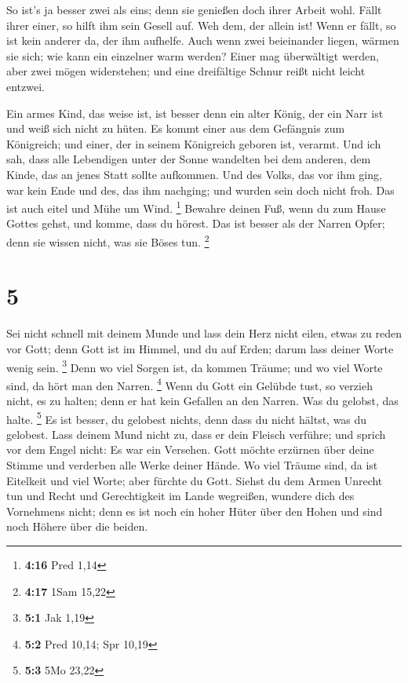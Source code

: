  So ist's ja besser zwei als eins; denn sie genießen doch
ihrer Arbeit wohl.  Fällt ihrer einer, so hilft ihm sein
Gesell auf. Weh dem, der allein ist! Wenn er fällt, so ist kein anderer
da, der ihm aufhelfe.  Auch wenn zwei beieinander liegen,
wärmen sie sich; wie kann ein einzelner warm werden? 
Einer mag überwältigt werden, aber zwei mögen widerstehen; und eine
dreifältige Schnur reißt nicht leicht entzwei.

 Ein armes Kind, das weise ist, ist besser denn ein alter
König, der ein Narr ist und weiß sich nicht zu hüten.  Es
kommt einer aus dem Gefängnis zum Königreich; und einer, der in seinem
Königreich geboren ist, verarmt.  Und ich sah, dass alle
Lebendigen unter der Sonne wandelten bei dem anderen, dem Kinde, das an
jenes Statt sollte aufkommen.  Und des Volks, das vor ihm
ging, war kein Ende und des, das ihm nachging; und wurden sein doch
nicht froh. Das ist auch eitel und Mühe um Wind. \footnote{\textbf{4:16}
  Pred 1,14}  Bewahre deinen Fuß, wenn du zum Hause
Gottes gehst, und komme, dass du hörest. Das ist besser als der Narren
Opfer; denn sie wissen nicht, was sie Böses tun. \footnote{\textbf{4:17}
  1Sam 15,22}

\hypertarget{section-1}{%
\section{5}\label{section-1}}

 Sei nicht schnell mit deinem Munde und lass dein Herz
nicht eilen, etwas zu reden vor Gott; denn Gott ist im Himmel, und du
auf Erden; darum lass deiner Worte wenig sein. \footnote{\textbf{5:1}
  Jak 1,19}  Denn wo viel Sorgen ist, da kommen Träume;
und wo viel Worte sind, da hört man den Narren. \footnote{\textbf{5:2}
  Pred 10,14; Spr 10,19}  Wenn du Gott ein Gelübde tust,
so verzieh nicht, es zu halten; denn er hat kein Gefallen an den Narren.
Was du gelobst, das halte. \footnote{\textbf{5:3} 5Mo 23,22}
 Es ist besser, du gelobest nichts, denn dass du nicht
hältst, was du gelobest.  Lass deinem Mund nicht zu, dass
er dein Fleisch verführe; und sprich vor dem Engel nicht: Es war ein
Versehen. Gott möchte erzürnen über deine Stimme und verderben alle
Werke deiner Hände.  Wo viel Träume sind, da ist Eitelkeit
und viel Worte; aber fürchte du Gott.  Siehst du dem Armen
Unrecht tun und Recht und Gerechtigkeit im Lande wegreißen, wundere dich
des Vornehmens nicht; denn es ist noch ein hoher Hüter über den Hohen
und sind noch Höhere über die beiden.


